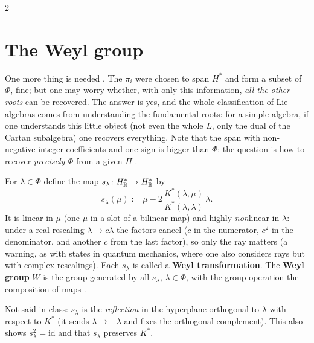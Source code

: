 \begin{paracol}{2}
\section{The Weyl group}\label{sec:cl-weyl}

One more thing is needed . The $\pi_i$ were chosen to span $H^*$ and form a subset of $\Phi$, fine; but one may worry whether, with only this information, \emph{all the other roots} can be recovered. The answer is yes, and the whole classification of Lie algebras comes from understanding the fundamental roots: for a simple algebra, if one understands this little object (not even the whole $L$, only the dual of the Cartan subalgebra) one recovers everything. Note that the span with non-negative integer coefficients and one sign is bigger than $\Phi$: the question is how to recover \emph{precisely} $\Phi$ from a given $\Pi$        .
\begin{definition}\label{def:cl-weyl}
For $\lambda\in\Phi$ define the map $s_\lambda\colon H^*_{\mathbb{R}}\to H^*_{\mathbb{R}}$ by
\[
  s_\lambda(\mu):=\mu-2\,\frac{K^*(\lambda,\mu)}{K^*(\lambda,\lambda)}\,\lambda .
\]
It is linear in $\mu$ (one $\mu$ in a slot of a bilinear map) and highly \emph{non}linear in $\lambda$: under a real rescaling $\lambda\to c\lambda$ the factors cancel ($c$ in the numerator, $c^2$ in the denominator, and another $c$ from the last factor), so only the ray matters (a warning, as with states in quantum mechanics, where one also considers rays but with complex rescalings). Each $s_\lambda$ is called a \textbf{Weyl transformation}. The \textbf{Weyl group} $W$ is the group generated by all $s_\lambda$, $\lambda\in\Phi$, with the group operation the composition of maps          .
\end{definition}
\begin{coursenote}
Not said in class: $s_\lambda$ is the \emph{reflection} in the hyperplane orthogonal to $\lambda$ with respect to $K^*$ (it sends $\lambda\mapsto-\lambda$ and fixes the orthogonal complement). This also shows $s_\lambda^2=\mathrm{id}$ and that $s_\lambda$ preserves $K^*$. 
\end{coursenote}

\end{paracol}
